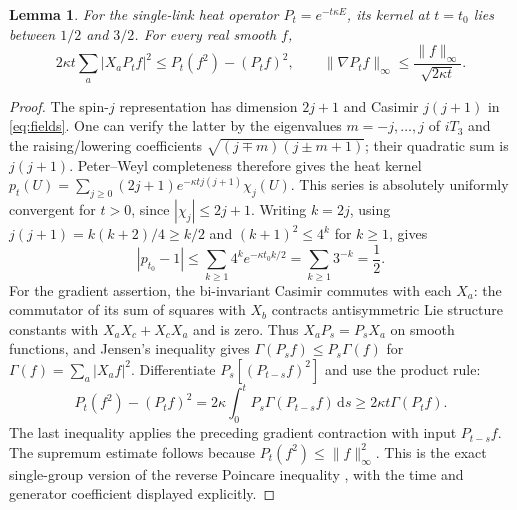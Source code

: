 \documentclass[11pt]{article}
\newtheorem{lemma}[theorem]{Lemma}
\newcommand{\dd}{\,\mathrm d}
\begin{document}
\begin{lemma}\label{lem:singleheat}
For the single-link heat operator $P_t=e^{-t\kappa E}$, its kernel at
$t=t_0$ lies between $1/2$ and $3/2$. For every real smooth $f$,
\begin{equation}\label{eq:reverse}
 2\kappa t\sum_a|X_aP_tf|^2
 \leq P_t(f^2)-(P_tf)^2,\qquad
 \|\nabla P_tf\|_\infty\leq\frac{\|f\|_\infty}{\sqrt{2\kappa t}}.
\end{equation}
\end{lemma}
\begin{proof}
The spin-$j$ representation has dimension $2j+1$ and Casimir $j(j+1)$
in \eqref{eq:fields}. One can verify the latter by the eigenvalues
$m=-j,\ldots,j$ of $iT_3$ and the raising/lowering coefficients
$\sqrt{(j\mp m)(j\pm m+1)}$; their quadratic sum is $j(j+1)$.
Peter--Weyl completeness therefore gives the heat kernel
$p_t(U)=\sum_{j\geq0}(2j+1)e^{-\kappa tj(j+1)}\chi_j(U)$.
This series is absolutely uniformly convergent for $t>0$, since
$|\chi_j|\leq2j+1$. Writing $k=2j$, using
$j(j+1)=k(k+2)/4\geq k/2$ and $(k+1)^2\leq4^k$ for $k\geq1$, gives
\[
 |p_{t_0}-1|\leq\sum_{k\geq1}4^k e^{-\kappa t_0k/2}
 =\sum_{k\geq1}3^{-k}=\frac12.
\]
For the gradient assertion, the bi-invariant Casimir commutes with
each $X_a$: the commutator of its sum of squares with $X_b$ contracts
antisymmetric Lie structure constants with $X_aX_c+X_cX_a$ and is zero.
Thus $X_aP_s=P_sX_a$ on smooth functions, and Jensen's inequality gives
$\Gamma(P_sf)\leq P_s\Gamma(f)$ for $\Gamma(f)=\sum_a|X_af|^2$.
Differentiate $P_s[(P_{t-s}f)^2]$ and use the product rule:
\[
 P_t(f^2)-(P_tf)^2=2\kappa\int_0^tP_s\Gamma(P_{t-s}f)\dd s
 \geq2\kappa t\Gamma(P_tf).
\]
The last inequality applies the preceding gradient contraction with
input $P_{t-s}f$. The supremum estimate follows because
$P_t(f^2)\leq\|f\|_\infty^2$. This is the exact single-group version
of the reverse Poincare inequality \cite[Eq.~(1.7)]{BL}, with the time
and generator coefficient displayed explicitly.
\end{proof}
\end{document}
